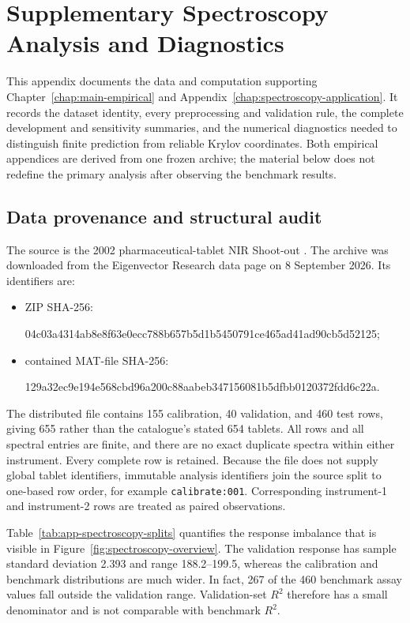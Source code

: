 \chapter{Supplementary Spectroscopy Analysis and Diagnostics}
\label{app:spectroscopy-supplement}

This appendix documents the data and computation supporting
Chapter~\ref{chap:main-empirical} and Appendix~\ref{chap:spectroscopy-application}.  It records the dataset identity, every
preprocessing and validation rule, the complete development and sensitivity
summaries, and the numerical diagnostics needed to distinguish finite
prediction from reliable Krylov coordinates.  Both empirical appendices are
derived from one frozen archive; the material below does not redefine the
primary analysis after observing the benchmark results.

\section{Data provenance and structural audit}
\label{sec:app-spectroscopy-provenance}

The source is the 2002 pharmaceutical-tablet NIR Shoot-out
\parencite{hopkins_2003,eigenvector_tablets}.  The archive was downloaded from
the Eigenvector Research data page on 8 September 2026.  Its identifiers are:
\begin{itemize}
    \item ZIP SHA-256:\par
    {\footnotesize\ttfamily
    04c03a4314ab8e8f63e0ecc788b657b5d1b5450791ce465ad41ad90cb5d52125};
    \item contained MAT-file SHA-256:\par
    {\footnotesize\ttfamily
    129a32ec9e194e568cbd96a200c88aabeb347156081b5dfbb0120372fdd6c22a}.
\end{itemize}
The distributed file contains 155 calibration, 40 validation, and 460 test
rows, giving 655 rather than the catalogue's stated 654 tablets.  All rows and
all spectral entries are finite, and there are no exact duplicate spectra
within either instrument.  Every complete row is retained.  Because the file
does not supply global tablet identifiers, immutable analysis identifiers join
the source split to one-based row order, for example
\texttt{calibrate:001}.  Corresponding instrument-1 and instrument-2 rows are
treated as paired observations.

Table~\ref{tab:app-spectroscopy-splits} quantifies the response imbalance that
is visible in Figure~\ref{fig:spectroscopy-overview}.  The validation response
has sample standard deviation 2.393 and range 188.2--199.5, whereas the
calibration and benchmark distributions are much wider.  In fact, 267 of the
460 benchmark assay values fall outside the validation range.  Validation-set
$R^2$ therefore has a small denominator and is not comparable with benchmark
$R^2$.

